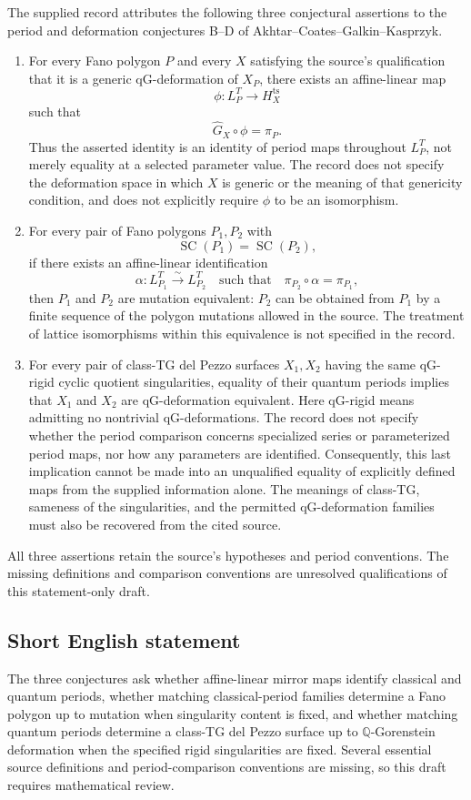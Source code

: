 \documentclass[11pt]{article}
\newcommand{\Q}{\mathbb{Q}}
\begin{document}
The supplied record attributes the following three conjectural assertions to the period and deformation conjectures B--D of Akhtar--Coates--Galkin--Kasprzyk.
\begin{enumerate}
\item[(B)] For every Fano polygon \(P\) and every \(X\) satisfying the source's qualification that it is a generic qG-deformation of \(X_P\), there exists an affine-linear map
\[
\phi\colon L_P^T\longrightarrow H_X^{\mathrm{ts}}
\]
such that
\[
\widehat G_X\circ\phi=\pi_P.
\]
Thus the asserted identity is an identity of period maps throughout \(L_P^T\), not merely equality at a selected parameter value. The record does not specify the deformation space in which \(X\) is generic or the meaning of that genericity condition, and does not explicitly require \(\phi\) to be an isomorphism.

\item[(C)] For every pair of Fano polygons \(P_1,P_2\) with
\[
\operatorname{SC}(P_1)=\operatorname{SC}(P_2),
\]
if there exists an affine-linear identification
\[
\alpha\colon L_{P_1}^T\xrightarrow{\sim}L_{P_2}^T
\quad\text{such that}\quad
\pi_{P_2}\circ\alpha=\pi_{P_1},
\]
then \(P_1\) and \(P_2\) are mutation equivalent: \(P_2\) can be obtained from \(P_1\) by a finite sequence of the polygon mutations allowed in the source. The treatment of lattice isomorphisms within this equivalence is not specified in the record.

\item[(D)] For every pair of class-TG del Pezzo surfaces \(X_1,X_2\) having the same qG-rigid cyclic quotient singularities, equality of their quantum periods implies that \(X_1\) and \(X_2\) are qG-deformation equivalent. Here qG-rigid means admitting no nontrivial qG-deformations. The record does not specify whether the period comparison concerns specialized series or parameterized period maps, nor how any parameters are identified. Consequently, this last implication cannot be made into an unqualified equality of explicitly defined maps from the supplied information alone. The meanings of class-TG, sameness of the singularities, and the permitted qG-deformation families must also be recovered from the cited source.
\end{enumerate}
All three assertions retain the source's hypotheses and period conventions. The missing definitions and comparison conventions are unresolved qualifications of this statement-only draft.
\subsection{Short English statement}
The three conjectures ask whether affine-linear mirror maps identify classical and quantum periods, whether matching classical-period families determine a Fano polygon up to mutation when singularity content is fixed, and whether matching quantum periods determine a class-TG del Pezzo surface up to \(\Q\)-Gorenstein deformation when the specified rigid singularities are fixed. Several essential source definitions and period-comparison conventions are missing, so this draft requires mathematical review.
\end{document}
